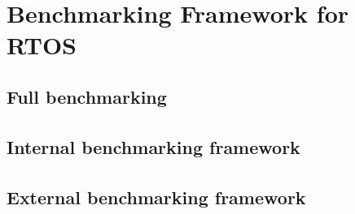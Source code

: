 \part{Benchmarking Framework for RTOS}


\chapter{Full benchmarking}
\paragraph{}




\chapter{Internal benchmarking framework}
\paragraph{}





\chapter{External benchmarking framework}
\paragraph{}



